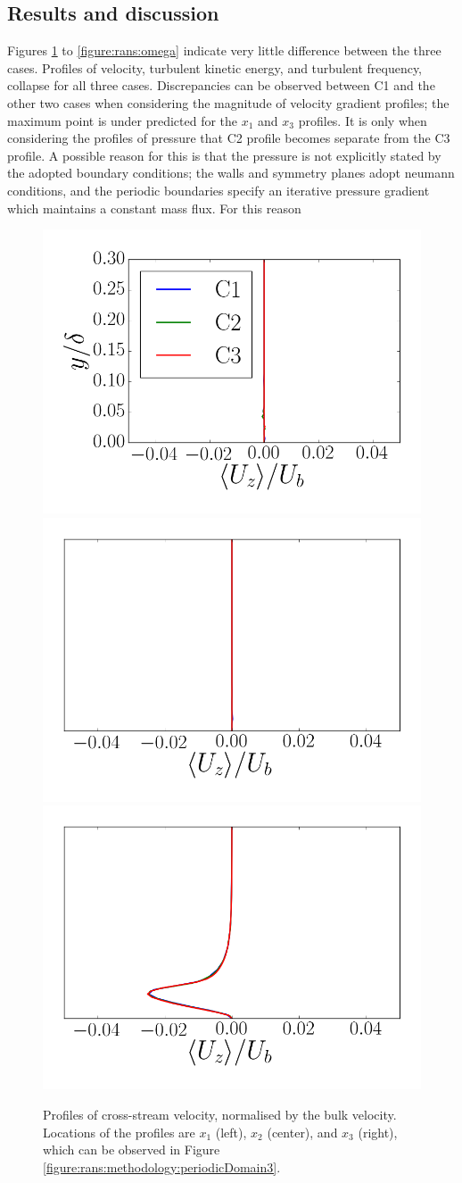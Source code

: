 \documentclass[12pt,oneside,a4paper]{article}
\begin{document}
\subsection{Results and discussion}
Figures \ref{figure:rans:Uz} to \ref{figure:rans:omega} indicate very little difference between the three cases. Profiles of velocity, turbulent kinetic energy, and turbulent frequency, collapse for all three cases. Discrepancies can be observed between C1 and the other two cases when considering the magnitude of velocity gradient profiles; the maximum point is under predicted for the $x_1$ and $x_3$ profiles. It is only when considering the profiles of pressure that C2 profile becomes separate from the C3 profile. A possible reason for this is that the pressure is not explicitly stated by the adopted boundary conditions; the walls and symmetry planes adopt neumann conditions, and the periodic boundaries specify an iterative pressure gradient which maintains a constant mass flux. For this reason
\begin{figure}
\centering
\includegraphics[width=0.33\linewidth]{images/CFD_meshIndependence/X1_Ux.png}\hfill \includegraphics[width=0.33\linewidth]{images/CFD_meshIndependence/X2_Ux.png}\hfill \includegraphics[width=0.33\linewidth]{images/CFD_meshIndependence/X3_Ux.png}\hfill
\caption{Profiles of cross-stream velocity, normalised by the bulk velocity. Locations of the profiles are $x_1$ (left), $x_2$ (center), and $x_3$ (right), which can be observed in Figure \ref{figure:rans:methodology:periodicDomain3}.}
\label{figure:rans:Uz}
\end{figure}
\end{document}
